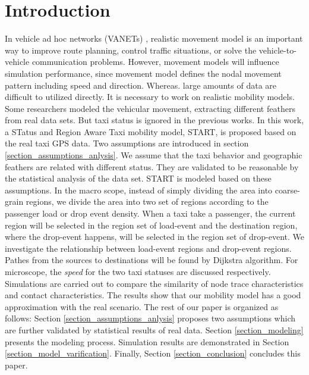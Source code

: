 \section{Introduction}
\label{section_introduction}

In vehicle ad hoc networks (VANETs) \cite{4068700}, realistic movement model is an important way to improve route planning, control traffic situations, or solve the vehicle-to-vehicle communication problems. However, movement models will influence simulation performance, since movement model defines the nodal movement pattern including speed and direction. Whereas. large amounts of data are difficult to utilized directly. It is necessary to work on realistic mobility models. Some researchers \cite{KimKotz-99,HuangZhu-88} modeled the vehicular movement, extracting different feathers from real data sets. But taxi status is ignored in the previous works.
In this work, a STatus and Region Aware Taxi mobility model, START, is proposed based on the real taxi GPS data. Two assumptions are introduced in section \ref{section_assumptions_anlysis}. We assume that the taxi behavior and geographic feathers are related with different status. They are validated to be reasonable by the statistical analysis of the data set.
START is modeled based on these assumptions. In the macro scope, instead of simply dividing the area into coarse-grain regions, we divide the area into two set of regions according to the passenger load or drop event density. When a taxi take a passenger, the current region will be selected in the region set of load-event and the destination region, where the drop-event happens, will be selected in the region set of drop-event. We investigate the relationship between load-event regions and drop-event regions. Pathes from the sources to destinations will be found by Dijkstra algorithm. For microscope, the \emph{speed} for the two taxi statuses are discussed respectively.
Simulations are carried out to compare the similarity of node trace characteristics and contact characteristics. The results show that our mobility model has a good approximation with the real scenario.
The rest of our paper is organized as follows: %
 Section \ref{section_assumptions_anlysis} proposes two assumptions which are further validated by statistical results of real data. Section \ref{section_modeling} presents the modeling process. Simulation results are demonstrated in Section \ref{section_model_varification}. Finally, Section \ref{section_conclusion} concludes this paper.


